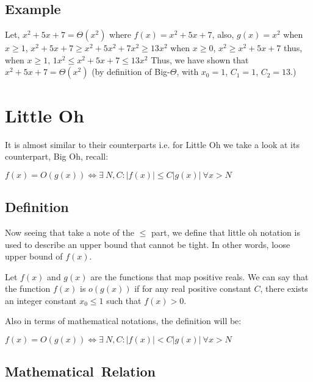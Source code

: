 \documentclass[a4paper,12pt]{article}
\theoremstyle{definition}
\begin{document}
    \subsection{Example}

    Let, $x^2 + 5x + 7 = \Theta(x^2)$ where $f(x) = x^2 + 5x + 7$, also, $g(x) = x^2$
    \noindent
    when $x \geq 1$, $x^2 + 5x + 7 \geq x^2 + 5x^2 + 7x^2 \geq 13x^2$
    \noindent
    when $x \geq 0$, $x^2 \geq x^2 + 5x + 7$
    \noindent
    thus, when $x \geq 1$, $1x^2 \leq x^2 + 5x + 7 \leq 13x^2$
    \noindent
    Thus, we have shown that
    $x^2 + 5x + 7 = \Theta(x^2)$ (by definition of Big-$\Theta$, with $x_0 = 1$, $C_1 = 1$, $C_2 = 13$.)


    \section{Little Oh}

    It is almost similar to their counterparts i.e. for Little Oh we take a look at its counterpart, Big Oh, recall:

    \begin{center}
        $f(x) = O(g(x)) \Leftrightarrow \exists\:N,C : |f(x)| \leq C|g(x)|\ \forall x > N$
    \end{center}

    \subsection{Definition}

    Now seeing that take a note of the $\leq$ part, we define that little oh notation is used to
    describe an upper bound that cannot be tight.
    In other words, loose upper bound of $f(x)$.

    Let $f(x)$ and $g(x)$ are the functions that map positive reals.
    We can say that the function $f(x)$ is $o(g(x))$ if for any real positive constant $C$,
    there exists an integer constant $x_0 \leq 1$ such that $f(x) > 0$.

    Also in terms of mathematical notations, the definition will be:

    \begin{center}
        $f(x) = O(g(x)) \Leftrightarrow \exists\:N,C : |f(x)| < C|g(x)|\ \forall x > N$
    \end{center}

    \subsection{Mathematical~Relation}
\end{document}
